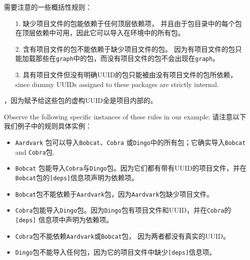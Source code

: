需要注意的一些概括性规则：



\begin{itemize}
\item[1. ] 缺少项目文件的包能依赖于任何顶层依赖项， 并且由于包目录中的每个包在顶层依赖中可用，因此它可以导入在环境中的所有包。


\item[2. ] 含有项目文件的包不能依赖于缺少项目文件的包。 因为有项目文件的包只能加载那些在\texttt{graph}中的包，而没有项目文件的包不会出现在\texttt{graph}。


\item[3. ] 具有项目文件但没有明确UUID的包只能被由没有项目文件的包所依赖， since dummy UUIDs assigned to these packages are strictly internal.

\end{itemize}


，因为赋予给这些包的虚构UUID全是项目内部的。



Observe the following specific instances of these rules in our example: 请注意以下我们例子中的规则具体实例：



\begin{itemize}
\item \texttt{Aardvark} 包可以导入\texttt{Bobcat}、\texttt{Cobra} 或\texttt{Dingo}中的所有包；它确实导入\texttt{Bobcat} and \texttt{Cobra}包.


\item \texttt{Bobcat} 包能导入\texttt{Cobra}与\texttt{Dingo}包。因为它们都有带有UUID的项目文件，并在\texttt{Bobcat}包的\texttt{[deps]}信息项声明为依赖项。


\item \texttt{Bobcat}包不能依赖于\texttt{Aardvark}包，因为\texttt{Aardvark}包缺少项目文件。


\item \texttt{Cobra}包能导入\texttt{Dingo}包。因为\texttt{Dingo}包有项目文件和UUID，并在\texttt{Cobra}的\texttt{[deps]} 信息项中声明为依赖项。


\item \texttt{Cobra}包不能依赖\texttt{Aardvark}或\texttt{Bobcat}包， 因为两者都没有真实的UUID。


\item \texttt{Dingo}包不能导入任何包，因为它的项目文件中缺少\texttt{[deps]}信息项。

\end{itemize}


